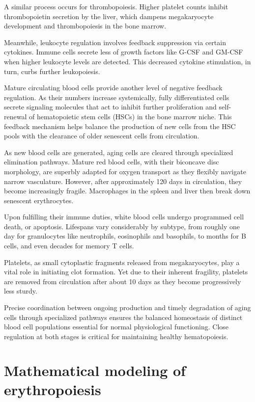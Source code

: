 A similar process occurs for thrombopoiesis. Higher platelet counts inhibit thrombopoietin secretion by the liver, which dampens megakaryocyte development and thrombopoiesis in the bone marrow.

Meanwhile, leukocyte regulation involves feedback suppression via certain cytokines. Immune cells secrete less of growth factors like G-CSF and GM-CSF when higher leukocyte levels are detected. This decreased cytokine stimulation, in turn, curbs further leukopoiesis.

Mature circulating blood cells provide another level of negative feedback regulation. As their numbers increase systemically, fully differentiated cells secrete signaling molecules that act to inhibit further proliferation and self-renewal of hematopoietic stem cells (HSCs) in the bone marrow niche. This feedback mechanism helps balance the production of new cells from the HSC pools with the clearance of older senescent cells from circulation.

As new blood cells are generated, aging cells are cleared through specialized elimination pathways. Mature red blood cells, with their biconcave disc morphology, are superbly adapted for oxygen transport as they flexibly navigate narrow vasculature. However, after approximately 120 days in circulation, they become increasingly fragile. Macrophages in the spleen and liver then break down senescent erythrocytes.

Upon fulfilling their immune duties, white blood cells undergo programmed cell death, or apoptosis. Lifespans vary considerably by subtype, from roughly one day for granulocytes like neutrophils, eosinophils and basophils, to months for B cells, and even decades for memory T cells.

Platelets, as small cytoplastic fragments released from megakaryocytes, play a vital role in initiating clot formation. Yet due to their inherent fragility, platelets are removed from circulation after about 10 days as they become progressively less sturdy.

Precise coordination between ongoing production and timely degradation of aging cells through specialized pathways ensures the balanced homeostasis of distinct blood cell populations essential for normal physiological functioning. Close regulation at both stages is critical for maintaining healthy hematopoiesis.

\section{Mathematical modeling of erythropoiesis}

